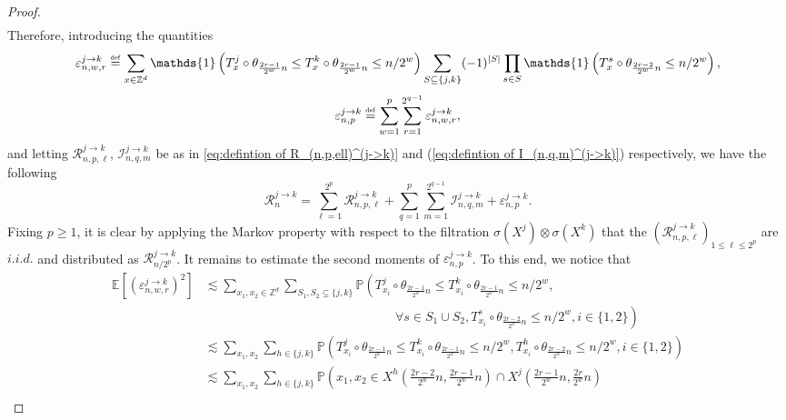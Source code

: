\documentclass[10pt,a4paper]{amsart}
\newcommand{\EE}{\mathbb E}
\newcommand{\PP}{\mathbb P}
\newcommand{\1}{\mathds{1}}
\newcommand{\ZZ}{\mathbb Z}
\newcommand{\eqdef}{\stackrel{\scaleto{\mathrm{def}}{3.5pt}}{=}}
\numberwithin{equation}{section}
\begin{document}
\begin{proof}
\begin{align*}
    \end{align*}
    Therefore, introducing the quantities
    \begin{equation*}
        \varepsilon_{n,w,r}^{j\rightarrow k}\eqdef\sum_{x\in\ZZ^d}\1\left(T_x^j\circ \theta_{\frac{2r-1}{2^w}n}\le T_x^k\circ\theta_{\frac{2r-1}{2^w}n}\le n/2^w\right)\sum_{S\subseteq\{j,k\}}(-1)^{|S|}\prod_{s\in S}\1\left(T_x^s\circ\theta_{\frac{2r-2}{2^w}n}\le n/2^w\right),
    \end{equation*}
    \begin{equation*}
        \varepsilon_{n,p}^{j\rightarrow k}\eqdef\sum_{w=1}^p\sum_{r=1}^{2^{q-1}}\varepsilon_{n,w,r}^{j\rightarrow k},
    \end{equation*}
    and letting $\mathcal R_{n,p,\ell}^{j\rightarrow k}$, $\mathcal I_{n,q,m}^{j\rightarrow k}$ be as in \eqref{eq:defintion of R_(n,p,ell)^(j->k)} and (\ref{eq:defintion of I_(n,q,m)^(j->k)}) respectively, we have the following
    \begin{equation*}
        \mathcal R_n^{j\rightarrow k}=\sum_{\ell=1}^{2^p}\mathcal R_{n,p,\ell}^{j\rightarrow k}+\sum_{q=1}^p\sum_{m=1}^{2^{q-1}}\mathcal I_{n,q,m}^{j\rightarrow k}+\varepsilon_{n,p}^{j\rightarrow k}.
    \end{equation*}
    Fixing $p\ge1$, it is clear by applying the Markov property with respect to the filtration $\sigma(X^j)\otimes\sigma(X^k)$ that the $(\mathcal R_{n,p,\ell}^{j\rightarrow k})_{1\le\ell\le 2^p}$ are $i.i.d.$ and distributed as $\mathcal R_{n/2^p}^{j\rightarrow k}$. It remains to estimate the second moments of $\varepsilon_{n,p}^{j\rightarrow k}$. To this end, we notice that
    \begin{align*}
        \EE\left[(\varepsilon_{n,w,r}^{j\rightarrow k})^2\right]&\lesssim\sum_{x_1,x_2\in\ZZ^d}\sum_{S_1,S_2\subseteq\{j,k\}}\PP\left(T_{x_i}^j\circ\theta_{\frac{2r-1}{2^w}n}\le T_{x_i}^{k}\circ\theta_{\frac{2r-1}{2^w}n}\le n/2^w,\right.\\
        &\hspace{15em}\left.\forall s\in S_1\cup S_2, T_{x_i}^s\circ\theta_{\frac{2r-2}{2^w}n}\le n/2^w, i\in\{1,2\}\right)\\
        &\lesssim\sum_{x_1,x_2}\sum_{h\in\{j,k\}}\PP\left(T_{x_i}^j\circ\theta_{\frac{2r-1}{2^w}n}\le T_{x_i}^{k}\circ\theta_{\frac{2r-1}{2^w}n}\le n/2^w,T_{x_i}^h\circ\theta_{\frac{2r-2}{2^w}n}\le n/2^w, i\in\{1,2\}\right)\\
        &\lesssim\sum_{x_1,x_2}\sum_{h\in\{j,k\}}\PP\left(x_1,x_2\in X^h\left(\frac{2r-2}{2^w}n,\frac{2r-1}{2^w}n\right)\cap X^{j}\left(\frac{2r-1}{2^w}n,\frac{2r}{2^w}n\right)\right.\\

\end{align*}
\end{proof}
\end{document}
